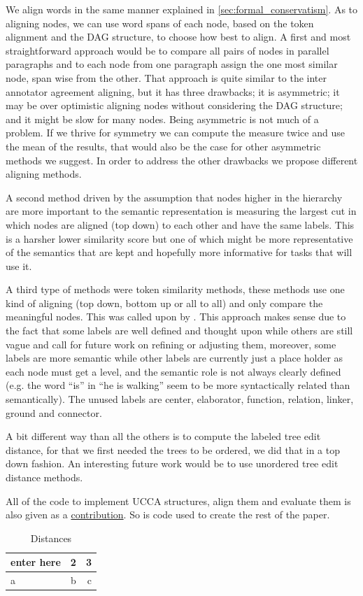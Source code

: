 \documentclass[english]{article}
\begin{document}
We align words in the same manner explained in \ref{sec:formal_conservatism}. As to aligning nodes, we can use word spans of each node, based on
the token alignment and the DAG structure, to choose how best to align.
A first and most straightforward approach would be to compare all
pairs of nodes in parallel paragraphs and to each node from one paragraph
assign the one most similar node, span wise from the other. That approach
is quite similar to the inter annotator agreement aligning, but it
has three drawbacks; it is asymmetric; it may be over optimistic aligning
nodes without considering the DAG structure; and it might be
slow for many nodes. Being asymmetric is not much of a problem. If we thrive for symmetry
we can compute the measure twice and use the mean of the results,
that would also be the case for other asymmetric methods we suggest.
In order to address the other drawbacks we propose different aligning methods.

A second method driven by the assumption that nodes higher in the
hierarchy are more important to the semantic representation is measuring
the largest cut in which nodes are aligned (top down) to each other
and have the same labels. This is a harsher lower similarity
score but one of which might be more representative of the semantics
that are kept and hopefully more informative for tasks that will use it.

A third type of methods were token similarity methods, these methods
use one kind of aligning (top down, bottom up or all to all) and only
compare the meaningful nodes. This was called upon by \cite{sulem2015conceptual}. 
This approach makes sense due to the fact that some labels
are well defined and thought upon while others are still vague and
call for future work on refining or adjusting them, moreover, some
labels are more semantic while other labels are currently just a place
holder as each node must get a level, and the semantic role is not
always clearly defined (e.g. the word ``is'' in ``he is walking''
seem to be more syntactically related than semantically). The unused
labels are center, elaborator, function, relation, linker, ground
and connector.

A bit different way than all the others is to compute the labeled
tree edit distance\cite{zhang1989simple}, for that we first needed
the trees to be ordered, we did that in a top down fashion. An interesting
future work would be to use unordered tree edit distance methods\cite{zhang1992editing}.

All of the code to implement UCCA structures, align them and evaluate
them is also given as a \href{https://github.com/borgr/assess_learner_language}{contribution}.
So is code used to create the rest of the paper.
\begin{table}[h!]
	\centering
	\caption{Distances}
	\label{tab:Distances}
	\begin{tabular}{l|c||r}
		enter here & 2 & 3\\
		\hline
		a & b & c\\
		\end{tabular}
		\end{table}
		
\end{document}
